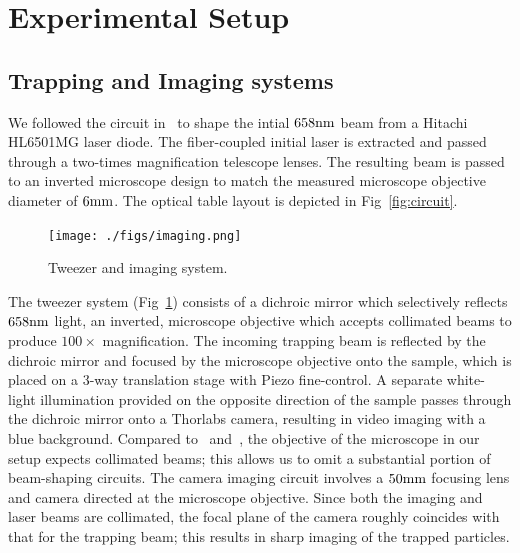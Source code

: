 \documentclass[aps,prb,twocolumn,superscriptaddress,floatfix,longbibliography,citeautoscript]{revtex4-2}
\begin{document}
\section{\label{sec:setup}Experimental Setup}
\subsection{\label{sec:imaging}Trapping and Imaging systems}
We followed the circuit in~\cite{OpticalTweezerInstructions} to shape 
the intial $658\mathrm{nm}$ beam from a Hitachi HL6501MG laser diode. 
The fiber-coupled initial laser is extracted and passed through a two-times 
magnification telescope lenses. 
The resulting beam is passed to an inverted microscope design to match the 
measured microscope objective diameter of $6\mathrm{mm}$. The optical table layout 
is depicted in Fig~\ref{fig:circuit}. 

\begin{figure}
    \centering
    \texttt{[image: ./figs/imaging.png]}
    \caption{Tweezer and imaging system. }
    \label{fig:tweezing}
\end{figure}
The tweezer system (Fig~\ref{fig:tweezing}) consists of a 
dichroic mirror which selectively reflects $658\mathrm{nm}$ light, an inverted, microscope objective which accepts collimated beams to produce $100\times$ magnification. 
The incoming trapping beam is reflected by the dichroic mirror and focused by the microscope objective onto the sample, which is placed on a 3-way translation stage with Piezo fine-control. A separate white-light illumination provided on 
the opposite direction of the sample passes through the dichroic mirror onto 
a Thorlabs camera, resulting in video imaging with a blue background. 
Compared to~\cite{OpticalTweezerInstructions} and~\cite{Smith1999AJP}, the objective of the microscope in our setup expects collimated beams; this allows us to omit 
a substantial portion of beam-shaping circuits. The camera imaging circuit involves a $50\mathrm{mm}$ focusing lens 
and camera directed at the microscope objective. Since both the imaging and laser beams are collimated, the focal plane of the camera roughly coincides with that for the trapping beam; this results in sharp imaging of the trapped particles. 
\end{document}
